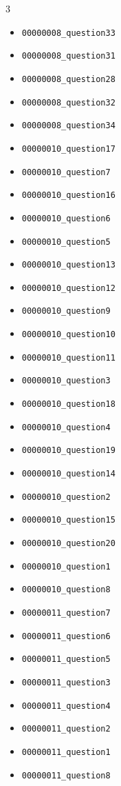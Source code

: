 \begin{multicols}{3}
\begin{itemize}[nosep, leftmargin=*]
        

        \item \texttt{00000008\_question33}
        \item \texttt{00000008\_question31}
        \item \texttt{00000008\_question28}
        \item \texttt{00000008\_question32}
        \item \texttt{00000008\_question34}
        
        

        \item \texttt{00000010\_question17}
        \item \texttt{00000010\_question7}
        \item \texttt{00000010\_question16}
        \item \texttt{00000010\_question6}
        \item \texttt{00000010\_question5}
        \item \texttt{00000010\_question13}
        \item \texttt{00000010\_question12}
        \item \texttt{00000010\_question9}
        \item \texttt{00000010\_question10}
        \item \texttt{00000010\_question11}
        \item \texttt{00000010\_question3}
        \item \texttt{00000010\_question18}
        \item \texttt{00000010\_question4}
        \item \texttt{00000010\_question19}
        \item \texttt{00000010\_question14}
        \item \texttt{00000010\_question2}
        \item \texttt{00000010\_question15}
        \item \texttt{00000010\_question20}
        \item \texttt{00000010\_question1}
        \item \texttt{00000010\_question8}
        
        

        \item \texttt{00000011\_question7}
        \item \texttt{00000011\_question6}
        \item \texttt{00000011\_question5}
        \item \texttt{00000011\_question3}
        \item \texttt{00000011\_question4}
        \item \texttt{00000011\_question2}
        \item \texttt{00000011\_question1}
        \item \texttt{00000011\_question8}
        

\end{itemize}
\end{multicols}
